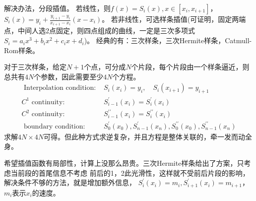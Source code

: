 \documentclass[lang=cn,newtx,10pt,scheme=chinese]{elegantbook}
\begin{document}
解决办法，分段插值。 若线性，则$f(x)=S_i(x), x \in[x_i, x_{i+1}]$，
$S_i(x)=y_i + \frac{y_{i+1} - y_i}{x_{i+1}-x_i}(x-x_i)$。
若非线性，可选样条插值(可证明，固定两端点，中间人选2点固定，则四点组成的曲线，一定是三次多项式
$S_i = a_i x^3 + b_i x^2 + c_i x + d_i$)。
经典的有：三次样条，三次Hermite样条，Catmull-Rom样条。

对于三次样条，给定$N+1$个点，可分成$N$个片段，每个片段由一个样条逼近，则总共有$4N$个参数，因此需要至少$4N$个方程。
\begin{equation}
  \begin{aligned}
  \text { Interpolation condition: } & S_i\left(x_i\right)=y_i, \quad S_i\left(x_{i+1}\right)=y_{i+1} \\
  C^1 \text { continuity: } & S_{i-1}^{\prime}\left(x_i\right)=S_i^{\prime}\left(x_i\right) \\
  C^2 \text { continuity: } & S_{i-1}^{\prime \prime}\left(x_i\right)=S_i^{\prime \prime}\left(x_i\right) \\
  \text { boundary condition: } & S_0^{\prime}\left(x_0\right), S_{n-1}^{\prime}\left(x_n\right), S_0^{\prime \prime}\left(x_0\right), S_{n-1}^{\prime \prime}\left(x_n\right)
  \end{aligned}
\end{equation}
求解$4N \times 4N$可得。但此种方式求逆复杂，并且方程是整体关联的，牵一发而动全身。

希望插值函数有局部性，计算上没那么昂贵。三次Hermite样条给出了方案，只考虑当前段的首尾信息不考虑
前后的1，2此光滑性，这样就不受前后片段的影响，解决条件不够的方法，就是增加额外信息，
$S_i^{\prime}(x_i)=m_i, S_{i+1}^{\prime}(x_i)=m_{i+1}$，$m_i$表示$x_i$的速度。
\end{document}
